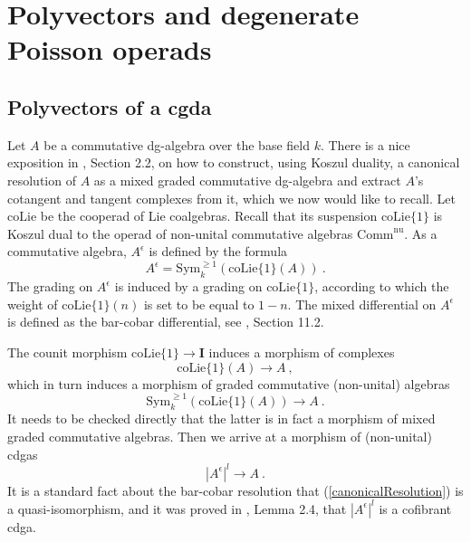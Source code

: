 \documentclass[10pt, oneside]{amsart}
\theoremstyle{plain}
\newcommand{\comm}{\mathrm{Comm}}
\newcommand{\colie}{\mathrm{coLie}}
\newcommand{\sym}{\mathrm{Sym}}
\begin{document}


\section{Polyvectors and degenerate Poisson operads}\label{sec4}

\subsection{Polyvectors of a cgda}\label{sec4.1}

Let $A$ be a commutative dg-algebra over the base field $k$. There is a nice exposition in \cite{Melani_2018}, Section 2.2, on how to construct, using Koszul duality, a canonical resolution of $A$ as a mixed graded commutative dg-algebra and extract $A$'s cotangent and
tangent complexes from it, which we now would like to recall.
Let $\colie$ be the cooperad of Lie coalgebras. Recall that its suspension $\colie\{1\}$ is Koszul dual to the operad of non-unital 
commutative algebras $\comm^\text{nu}$. As a commutative algebra, $A^\epsilon$ is defined by the formula
\begin{equation*}
A^\epsilon = \sym^{\ge 1}_k(\colie\{1\}(A)) \:.
\end{equation*}
The grading on $A^\epsilon$ is induced by a grading on $\colie\{1\}$, according to which the weight of $\colie\{1\}(n)$ is set to be 
equal to $1-n$. The mixed differential on $A^\epsilon$ is defined as the bar-cobar differential, see \cite{LV}, Section 11.2.

The counit morphism $\colie\{1\} \longrightarrow \mathbf{I}$ induces a morphism of complexes
\begin{equation*}
\colie\{1\}(A) \longrightarrow A \:,
\end{equation*}
which in turn induces a morphism of graded commutative (non-unital) algebras
\begin{equation*}
\sym_k^{\ge 1}(\colie\{1\}(A)) \longrightarrow A \:.
\end{equation*}
It needs to be checked directly that the latter is in fact a morphism of mixed graded commutative algebras. Then we arrive at a
morphism of (non-unital) cdgas
\begin{equation}\label{canonicalResolution}
|A^\epsilon|^l \longrightarrow A \:.
\end{equation}
It is a standard fact about the bar-cobar resolution that (\ref{canonicalResolution}) is a quasi-isomorphism,
and it was proved in \cite{Melani_2018}, Lemma 2.4, that $|A^\epsilon|^l$ is a cofibrant cdga.
\end{document}
